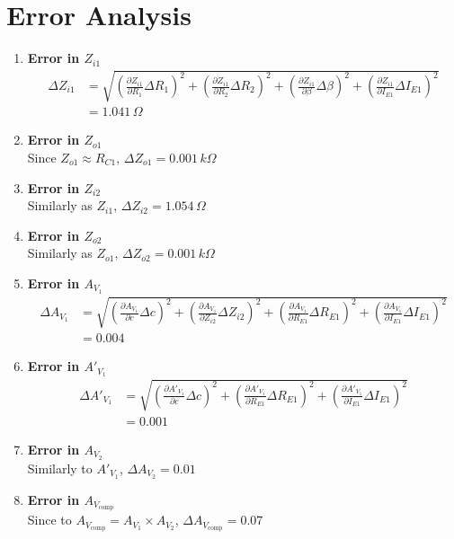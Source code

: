 \section{Error Analysis}

\begin{enumerate}
    \item \textbf{Error in $Z_{i1}$}
        \begin{align*}
            \scriptstyle \Delta Z_{i1} &= \scriptstyle \sqrt{\left( \frac{\partial Z_{i1}}{\partial R_1} \Delta R_1 \right)^2 + \left( \frac{\partial Z_{i1}}{\partial R_2} \Delta R_2 \right)^2 + \left( \frac{\partial Z_{i1}}{\partial\beta} \Delta\beta \right)^2 + \left( \frac{\partial Z_{i1}}{\partial I_{E1}} \Delta I_{E1} \right)^2} \\
             &= 1.041\,\Omega
        \end{align*}
    \item \textbf{Error in $Z_{o1}$}\\
        Since $Z_{o1} \approx R_{C1}$, $\Delta Z_{o1} = 0.001\,k\Omega$
    \item \textbf{Error in $Z_{i2}$}\\
        Similarly as $Z_{i1}$, $\Delta Z_{i2} = 1.054\,\Omega$
    \item \textbf{Error in $Z_{o2}$}\\
        Similarly as $Z_{o1}$, $\Delta Z_{o2} = 0.001\,k\Omega$
    \item \textbf{Error in $A_{V_1}$}
        \begin{align*}
            \scriptstyle\Delta A_{V_1} &= \scriptstyle \sqrt{\left( \frac{\partial A_{V_1}}{\partial c} \Delta c \right)^2 + \left( \frac{\partial A_{V_1}}{\partial Z_{i2}} \Delta Z_{i2} \right)^2 + \left( \frac{\partial A_{V_1}}{\partial R_{E1}} \Delta R_{E1} \right)^2 + \left( \frac{\partial A_{V_1}}{\partial I_{E1}} \Delta I_{E1} \right)^2} \\
            &= 0.004
        \end{align*}
    \item \textbf{Error in $A'_{V_1}$}
        \begin{align*}
            \scriptstyle\Delta A'_{V_1} &= \scriptstyle \sqrt{\left( \frac{\partial A'_{V_1}}{\partial c} \Delta c \right)^2 + \left( \frac{\partial A'_{V_1}}{\partial R_{E1}} \Delta R_{E1} \right)^2 + \left( \frac{\partial A'_{V_1}}{\partial I_{E1}} \Delta I_{E1} \right)^2} \\
            &= 0.001
        \end{align*}
    \item \textbf{Error in $A_{V_2}$}\\
        Similarly to $A'_{V_1}$, $\Delta A_{V_2} = 0.01$
    \item \textbf{Error in $A_{V_\text{comp}}$}\\
        Since to $A_{V_\text{comp}} = A_{V_1} \times A_{V_2}$, $\Delta A_{V_\text{comp}} = 0.07$

\end{enumerate}